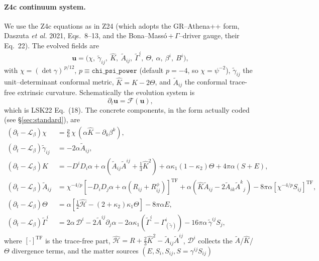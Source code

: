 \documentclass[11pt]{article}
\newcommand{\code}[1]{\texttt{#1}}
\newcommand{\Lie}{\mathcal{L}}
\newcommand{\dtb}{(\partial_t-\Lie_\beta)}
\newcommand{\gt}{\tilde\gamma}
\newcommand{\At}{\tilde A}
\newcommand{\Gamt}{\tilde\Gamma}
\newcommand{\Fop}{\mathcal{F}}            %
\newcommand{\half}{\tfrac12}
\newcommand{\third}{\tfrac13}
\begin{document}
\paragraph{Z4c continuum system.} We use the Z4c equations as in Z24 (which
adopts the GR--Athena++ form, Daszuta \emph{et al.} 2021, Eqs.~8--13, and the
Bona--Mass\'o\,$+\,\Gamma$--driver gauge, their Eq.~22). The evolved fields are
\begin{equation}
  \bm{u}=\bigl(\chi,\ \gt_{ij},\ \hat K,\ \At_{ij},\ \Gamt^{i},\ \Theta,\
  \alpha,\ \beta^{i},\ B^{i}\bigr),
  \label{eq:fields}
\end{equation}
with $\chi=(\det\gamma)^{\,p/12}$, $p\equiv\code{chi\_psi\_power}$
(default $p=-4$, so $\chi=\psi^{-2}$), $\gt_{ij}$ the unit--determinant
conformal metric, $\hat K=K-2\Theta$, and $\At_{ij}$ the conformal trace-free
extrinsic curvature. Schematically the evolution system is
\begin{equation}
  \partial_t \bm{u} = \Fop(\bm{u}),
  \label{eq:dtuF}
\end{equation}
which is LSK22 Eq.~(18). The concrete components, in the form actually coded
(see \S\ref{sec:standard}), are
\begin{align}
  \dtb\chi   &= \tfrac{p}{6}\,\chi\,(\alpha \hat K - \partial_k\beta^k),
    \label{eq:chi}\\
  \dtb\gt_{ij} &= -2\alpha\At_{ij}, \label{eq:g}\\
  \dtb\hat K &= -D^iD_i\alpha + \alpha\!\left(\At_{ij}\At^{ij}+\third\hat K^2\right)
        + \alpha\kappa_1(1-\kappa_2)\Theta + 4\pi\alpha(S+E),
    \label{eq:Khat}\\
  \dtb\At_{ij} &= \chi^{-4/p}\!\left[-D_iD_j\alpha+\alpha(R_{ij}+R^\phi_{ij})\right]^{\mathrm{TF}}
        + \alpha(\hat K\At_{ij}-2\At_{ik}\At^k{}_j)
        - 8\pi\alpha\!\left[\chi^{-4/p}S_{ij}\right]^{\mathrm{TF}},
    \label{eq:A}\\
  \dtb\Theta &= \alpha\!\left[\half\hat{\mathcal H} - (2+\kappa_2)\kappa_1\Theta\right]
        - 8\pi\alpha E,
    \label{eq:Theta}\\
  \dtb\Gamt^i &= 2\alpha\,\mathcal{D}^i
        - 2\At^{ij}\partial_j\alpha
        - 2\alpha\kappa_1(\Gamt^i-\Gamma^i_{(\gt)})
        - 16\pi\alpha\,\gt^{ij}S_j,
    \label{eq:Gam}
\end{align}
where $[\cdot]^{\mathrm{TF}}$ is the trace-free part, $\hat{\mathcal H}=R+\tfrac23\hat
K^2-\At_{ij}\At^{ij}$, $\mathcal D^i$ collects the $\At$/$\hat K$/$\Theta$
divergence terms, and the matter sources $(E,S_i,S_{ij},S=\gamma^{ij}S_{ij})$
\end{document}
